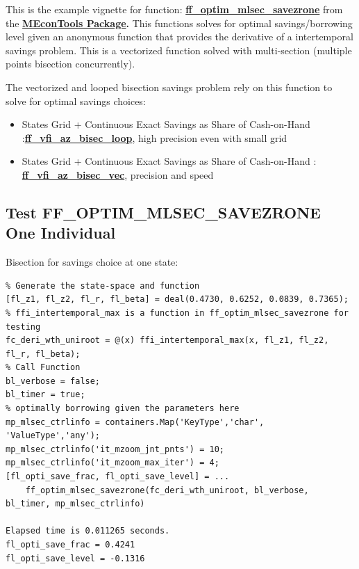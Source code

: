 \documentclass[
]{book}
\begin{document}
This is the example vignette for function:
\href{https://github.com/FanWangEcon//MEconTools/blob/master/MEconTools/optim/ff_optim_mlsec_savezrone.m}{\textbf{ff\_optim\_mlsec\_savezrone}}
from the \href{https://fanwangecon.github.io/MEconTools/}{\textbf{MEconTools
Package}}\textbf{.} This
functions solves for optimal savings/borrowing level given an anonymous
function that provides the derivative of a intertemporal savings
problem. This is a vectorized function solved with multi-section
(multiple points bisection concurrently).

The vectorized and looped bisection savings problem rely on this
function to solve for optimal savings choices:

\begin{itemize}
\item
  States Grid + Continuous Exact Savings as Share of Cash-on-Hand :\href{https://github.com/FanWangEcon/MEconTools/blob/master/MEconTools/vfi/ff_vfi_az_bisec_loop.m}{\textbf{ff\_vfi\_az\_bisec\_loop}},
  high precision even with small grid
\item
  States Grid + Continuous Exact Savings as Share of Cash-on-Hand :
  \href{https://github.com/FanWangEcon/MEconTools/blob/master/MEconTools/vfi/ff_vfi_az_bisec_vec.m}{\textbf{ff\_vfi\_az\_bisec\_vec}},
  precision and speed
\end{itemize}

\hypertarget{test-ff_optim_mlsec_savezrone-one-individual}{%
\subsection{Test FF\_OPTIM\_MLSEC\_SAVEZRONE One Individual}\label{test-ff_optim_mlsec_savezrone-one-individual}}

Bisection for savings choice at one state:

\begin{verbatim}
% Generate the state-space and function
[fl_z1, fl_z2, fl_r, fl_beta] = deal(0.4730, 0.6252, 0.0839, 0.7365);
% ffi_intertemporal_max is a function in ff_optim_mlsec_savezrone for testing
fc_deri_wth_uniroot = @(x) ffi_intertemporal_max(x, fl_z1, fl_z2, fl_r, fl_beta);
% Call Function
bl_verbose = false;
bl_timer = true;
% optimally borrowing given the parameters here
mp_mlsec_ctrlinfo = containers.Map('KeyType','char', 'ValueType','any');
mp_mlsec_ctrlinfo('it_mzoom_jnt_pnts') = 10;
mp_mlsec_ctrlinfo('it_mzoom_max_iter') = 4;
[fl_opti_save_frac, fl_opti_save_level] = ...
    ff_optim_mlsec_savezrone(fc_deri_wth_uniroot, bl_verbose, bl_timer, mp_mlsec_ctrlinfo)

Elapsed time is 0.011265 seconds.
fl_opti_save_frac = 0.4241
fl_opti_save_level = -0.1316
\end{verbatim}
\end{document}

